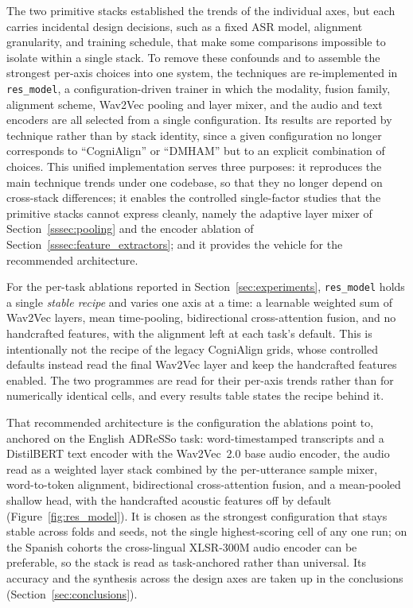 \documentclass[a4paper,12pt]{article}
\begin{document}
The two primitive stacks established the trends of the individual axes, but each carries incidental design decisions, such as a fixed ASR model, alignment granularity, and training schedule, that make some comparisons impossible to isolate within a single stack. To remove these confounds and to assemble the strongest per-axis choices into one system, the techniques are re-implemented in \texttt{res\_model}, a configuration-driven trainer in which the modality, fusion family, alignment scheme, Wav2Vec pooling and layer mixer, and the audio and text encoders are all selected from a single configuration. Its results are reported by technique rather than by stack identity, since a given configuration no longer corresponds to ``CogniAlign'' or ``DMHAM'' but to an explicit combination of choices. This unified implementation serves three purposes: it reproduces the main technique trends under one codebase, so that they no longer depend on cross-stack differences; it enables the controlled single-factor studies that the primitive stacks cannot express cleanly, namely the adaptive layer mixer of Section~\ref{sssec:pooling} and the encoder ablation of Section~\ref{sssec:feature_extractors}; and it provides the vehicle for the recommended architecture.

For the per-task ablations reported in Section~\ref{sec:experiments}, \texttt{res\_model} holds a single \emph{stable recipe} and varies one axis at a time: a learnable weighted sum of Wav2Vec layers, mean time-pooling, bidirectional cross-attention fusion, and no handcrafted features, with the alignment left at each task's default. This is intentionally not the recipe of the legacy CogniAlign grids, whose controlled defaults instead read the final Wav2Vec layer and keep the handcrafted features enabled. The two programmes are read for their per-axis trends rather than for numerically identical cells, and every results table states the recipe behind it.

That recommended architecture is the configuration the ablations point to, anchored on the English ADReSSo task: word-timestamped transcripts and a DistilBERT text encoder with the Wav2Vec~2.0 base audio encoder, the audio read as a weighted layer stack combined by the per-utterance sample mixer, word-to-token alignment, bidirectional cross-attention fusion, and a mean-pooled shallow head, with the handcrafted acoustic features off by default (Figure~\ref{fig:res_model}). It is chosen as the strongest configuration that stays stable across folds and seeds, not the single highest-scoring cell of any one run; on the Spanish cohorts the cross-lingual XLSR-300M audio encoder can be preferable, so the stack is read as task-anchored rather than universal. Its accuracy and the synthesis across the design axes are taken up in the conclusions (Section~\ref{sec:conclusions}).
\end{document}
